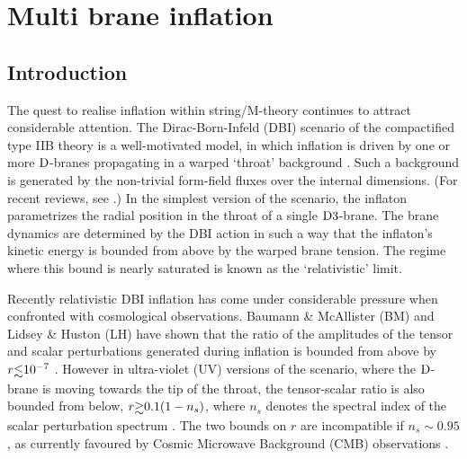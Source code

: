 \renewcommand{\CVSrevision}{\version$Id: multibrane.tex,v 1.5 2009/07/14 17:09:47 ith Exp $}

\chapter{Multi brane inflation}
\label{ch:multibrane}

\section{Introduction}

The quest to realise inflation within string/M-theory continues to 
attract considerable attention. The Dirac-Born-Infeld (DBI) scenario 
of the compactified type IIB theory is a well-motivated model, 
in which inflation is driven by one or more ${\rm D}$-branes 
propagating in a warped `throat' background
\cite{brane1,brane11,brane12,brane13,brane2,brane20,brane3,brane4,brane5,brane6}
. Such a background is generated 
by the non-trivial form-field fluxes over the internal dimensions. 
(For recent reviews, see
\cite{tyereview,McAllister:2007bg,Lorenz:2007ze,Kallosh:2007wm,Bean:2007eh,bean,
cline}.) 
In the simplest version of the scenario, 
the inflaton parametrizes the radial 
position in the throat of a single ${\rm D3}$-brane. 
The brane dynamics are determined by the DBI action in such a 
way that the inflaton's kinetic energy is bounded from above by the warped 
brane tension. The regime where this bound is nearly saturated is 
known as the `relativistic' limit.

Recently relativistic DBI inflation has come under considerable 
pressure when confronted with cosmological observations.  
Baumann \& McAllister (BM) and Lidsey \& Huston (LH) 
have shown that the ratio of the amplitudes of the 
tensor and scalar perturbations generated during 
inflation is bounded from above by $r \lsim 10^{-7}$
\cite{bmpaper,lidseyhuston}. 
However in ultra-violet (UV) versions of the scenario, where 
the ${\rm D}$-brane is moving towards the tip of the throat, the tensor-scalar 
ratio is also bounded from below, $r \gsim 0.1 (1-n_s)$, 
where $n_s$ denotes the spectral index 
of the scalar perturbation spectrum \cite{lidseyhuston}. 
The two bounds on $r$ are incompatible 
if $n_s \sim 0.95$, as currently favoured by Cosmic Microwave Background 
(CMB) observations \cite{spergel,Komatsu:2008hk}. 

